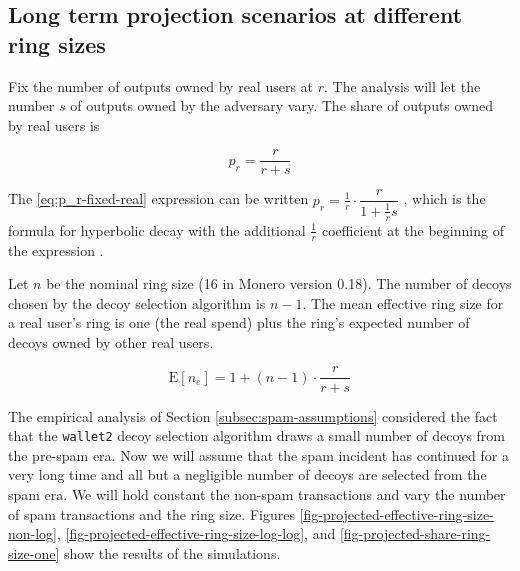 \documentclass[usletter,11pt,english,openany]{article}
\begin{document}
\subsection{Long term projection scenarios at different ring sizes}

Fix the number of outputs owned by real users at $r$. The analysis
will let the number $s$ of outputs owned by the adversary vary. The
share of outputs owned by real users is

\begin{equation}
p_{r}=\dfrac{r}{r+s}\label{eq:p_r-fixed-real}
\end{equation}

The \ref{eq:p_r-fixed-real} expression can be written $p_{r}=\frac{1}{r}\cdot\dfrac{r}{1+\tfrac{1}{r}s}$
, which is the formula for hyperbolic decay with the additional $\frac{1}{r}$
coefficient at the beginning of the expression \cite{Aguado2010}.

Let $n$ be the nominal ring size (16 in Monero version 0.18). The
number of decoys chosen by the decoy selection algorithm is $n-1$.
The mean effective ring size for a real user's ring is one (the real
spend) plus the ring's expected number of decoys owned by other real
users.

\begin{equation}
\mathrm{E}\left[n_{e}\right]=1+\left(n-1\right)\cdot\dfrac{r}{r+s}\label{eq:expectation-n_e}
\end{equation}

The empirical analysis of Section \ref{subsec:spam-assumptions} considered
the fact that the \texttt{wallet2} decoy selection algorithm draws
a small number of decoys from the pre-spam era. Now we will assume
that the spam incident has continued for a very long time and all
but a negligible number of decoys are selected from the spam era.
We will hold constant the non-spam transactions and vary the number
of spam transactions and the ring size. Figures \ref{fig-projected-effective-ring-size-non-log},
\ref{fig-projected-effective-ring-size-log-log}, and \ref{fig-projected-share-ring-size-one}
show the results of the simulations.
\end{document}
